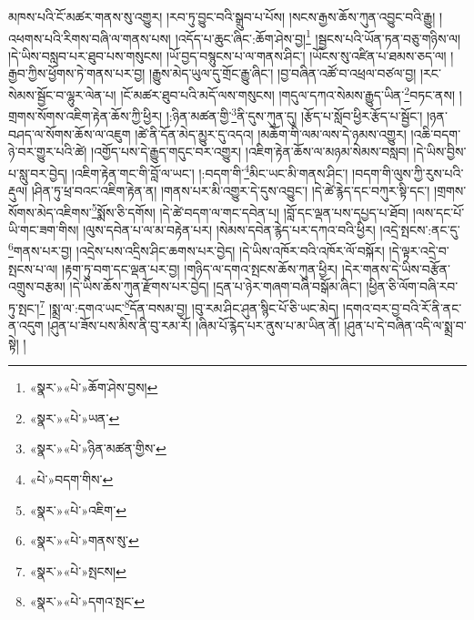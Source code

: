 མཁས་པའི་ངོ་མཚར་གནས་སུ་འགྱུར། །རབ་ཏུ་བྱུང་བའི་སྒྲུབ་པ་པོས། །སངས་རྒྱས་ཆོས་ཀུན་འབྱུང་བའི་རྒྱུ། །འཕགས་པའི་རིགས་བཞི་ལ་གནས་པས། །འདོད་པ་ཆུང་ཞིང་:ཆོག་ཤེས་བྱ།\footnote{«སྣར་»«པེ་»ཆོག་ཤེས་བྱས།} །སྦྱངས་པའི་ཡོན་ཏན་བཅུ་གཉིས་ལ། །དེ་ཡིས་བསླབ་པར་ཐུབ་པས་གསུངས། །ཡོ་བྱད་བསྙུངས་པ་ལ་གནས་ཤིང་། །ཡོངས་སུ་འཛིན་པ་ཐམས་ཅད་ལ། །རྒྱབ་ཀྱིས་ཕྱོགས་ཏེ་གནས་པར་བྱ། །རྒྱུས་མེད་ཡུལ་དུ་གྲོང་རྒྱུ་ཞིང་། །བྱ་བཞིན་འཚོ་བ་འཕྲལ་བཙལ་བྱ། །རང་སེམས་སྦྱོང་བ་ལྷུར་ལེན་པ། །ངོ་མཚར་ཐུབ་པའི་མདོ་ལས་གསུངས། །གདུལ་དཀའ་སེམས་རྒྱུད་ཡིན་\footnote{«སྣར་»«པེ་»ཡན་}བཏང་ནས། །གྲགས་སོགས་འཇིག་རྟེན་ཆོས་ཀྱི་ཕྱིར། །:ཉིན་མཚན་གྱི་\footnote{«སྣར་»«པེ་»ཉིན་མཚན་གྱིས་}ནི་དུས་ཀུན་དུ། །རྩོད་པ་སློབ་ཕྱིར་རྩོད་པ་སྦྱོང་། །ཉན་བཤད་ལ་སོགས་ཆོས་ལ་འཇུག །ཚེ་ནི་དོན་མེད་མྱུར་དུ་འདའ། །མཆོག་གི་ལམ་ལས་དེ་ཉམས་འགྱུར། །འཆི་བདག་ཉེ་བར་གྱུར་པའི་ཚེ། །འགྱོད་པས་དེ་རྒྱུད་གདུང་བར་འགྱུར། །འཇིག་རྟེན་ཆོས་ལ་མཉམ་སེམས་བསླབ། །དེ་ཡིས་བྱིས་པ་སླུ་བར་བྱེད། །འཇིག་རྟེན་གང་གི་བློ་ལ་ཡང་། །:བདག་གི་\footnote{«པེ་»བདག་གིས་}མིང་ཡང་མི་གནས་ཤིང་། །བདག་གི་ལུས་ཀྱི་རུས་པའི་རྡུལ། །ཤིན་ཏུ་ཕྲ་བའང་འཇིག་རྟེན་ན། །གནས་པར་མི་འགྱུར་དེ་དུས་འབྱུང་། །དེ་ཚེ་རྙེད་དང་བཀུར་སྟི་དང་། །གྲགས་སོགས་མེད་འཇིགས་\footnote{«སྣར་»«པེ་»འཇིག་}སྨོས་ཅི་དགོས། །དེ་ཚེ་བདག་ལ་གང་དབེན་པ། །བློ་དང་ལྡན་པས་དཔྱད་པ་ཐོབ། །ལས་དང་པོ་ཡི་གང་ཟག་གིས། །ལུས་དབེན་པ་ལ་མ་བརྟེན་པར། །སེམས་དབེན་རྙེད་པར་དཀའ་བའི་ཕྱིར། །འདྲེ་སྤངས་:ནང་དུ་\footnote{«སྣར་»«པེ་»གནས་སུ་}གནས་པར་བྱ། །འདྲེས་པས་འདྲིས་ཤིང་ཆགས་པར་བྱེད། །དེ་ཡིས་འཁོར་བའི་འཁོར་ལོ་བསྐོར། །དེ་ལྟར་འདྲེ་བ་སྤངས་པ་ལ། །རྟག་ཏུ་བག་དང་ལྡན་པར་བྱ། །གཉིད་ལ་དགའ་སྤངས་ཆོས་ཀུན་ཕྱིར། །དེར་གནས་དེ་ཡིས་བརྩོན་འགྲུས་བརྩམ། །དེ་ཡིས་ཆོས་ཀུན་རྫོགས་པར་བྱེད། །དྲན་པ་ཉེར་གཞག་བཞི་བསྒོམ་ཞིང་། །ཕྱིན་ཅི་ལོག་བཞི་རབ་ཏུ་སྤང་།\footnote{«སྣར་»«པེ་»སྤངས།} །སྨྲ་ལ་:དགའ་ཡང་\footnote{«སྣར་»«པེ་»དགའ་སྤང་}དོན་བསམ་བྱ། །བུ་རམ་ཤིང་ཤུན་སྙིང་པོ་ཅི་ཡང་མེད། །དགའ་བར་བྱ་བའི་རོ་ནི་ནང་ན་འདུག །ཤུན་པ་ཟོས་པས་མིས་ནི་བུ་རམ་རོ། །ཞིམ་པོ་རྙེད་པར་ནུས་པ་མ་ཡིན་ནོ། །ཤུན་པ་དེ་བཞིན་འདི་ལ་སྨྲ་བ་སྟེ། །
